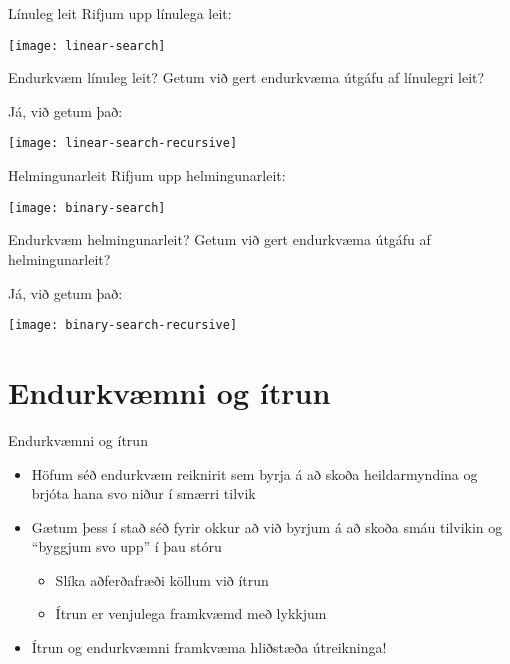 \documentclass{beamer}
\begin{document}
\begin{frame}{Línuleg leit}
Rifjum upp línulega leit:
\begin{center}
\texttt{[image: linear-search]}
\end{center}
\end{frame}

\begin{frame}{Endurkvæm línuleg leit?}
Getum við gert endurkvæma útgáfu af línulegri leit?\pause

Já, við getum það:
\begin{center}
\texttt{[image: linear-search-recursive]}
\end{center}
\end{frame}

\begin{frame}{Helmingunarleit}
Rifjum upp helmingunarleit:
\begin{center}
\texttt{[image: binary-search]}
\end{center}
\end{frame}

\begin{frame}{Endurkvæm helmingunarleit?}
Getum við gert endurkvæma útgáfu af helmingunarleit?\pause

Já, við getum það:
\begin{center}
\texttt{[image: binary-search-recursive]}
\end{center}
\end{frame}

\section{Endurkvæmni og ítrun}

\begin{frame}{Endurkvæmni og ítrun}
\begin{itemize}
 \item Höfum séð endurkvæm reiknirit sem byrja á að skoða heildarmyndina og brjóta hana svo niður í smærri tilvik
 \item Gætum þess í stað séð fyrir okkur að við byrjum á að skoða smáu tilvikin og ``byggjum svo upp'' í þau stóru
 \begin{itemize}
  \item Slíka aðferðafræði köllum við ítrun
  \item Ítrun er venjulega framkvæmd með lykkjum
 \end{itemize}
 \item Ítrun og endurkvæmni framkvæma hliðstæða útreikninga!
\end{itemize}
\end{frame}
\end{document}
